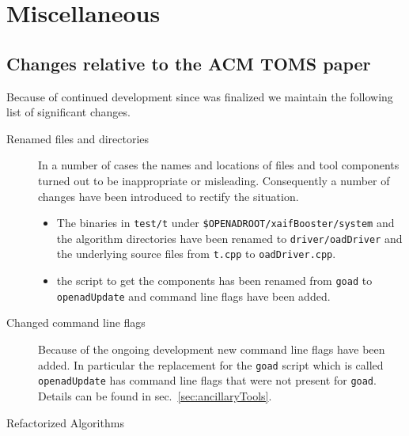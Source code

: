 \documentclass{book}
\newcommand{\refsec}[1]{{sec.~\ref{#1}}}
\begin{document}
\chapter{Miscellaneous}\label{sec:misc}
\section{Changes relative to the ACM TOMS paper}\label{sec:changesSinceTOMS}
Because of continued development since \cite{Utke2008OAM} was finalized 
we maintain the following list of significant changes.
\begin{description} 
\item[Renamed files and directories] In a number of cases the names and locations of files and 
tool components turned out to be inappropriate or misleading. Consequently a number of changes 
have been introduced to rectify the situation.  
{
\begin{itemize}
\item The binaries in \lstinline{test/t} under \lstinline{$OPENADROOT/xaifBooster/system} %
and the algorithm directories have been renamed to \lstinline{driver/oadDriver} and the 
underlying source files from \lstinline{t.cpp} to \lstinline{oadDriver.cpp}.
\item the script to get the components has been renamed from \lstinline{goad} to \lstinline{openadUpdate}
and command line flags have been added.
\end{itemize}
}
\item[Changed command line flags] Because of the ongoing development new command line flags have been added.
In particular the replacement for the \lstinline{goad} script which is called \lstinline{openadUpdate} has command 
line flags that were not present for \lstinline{goad}. Details can be found in \refsec{sec:ancillaryTools}.
\item[Refactorized Algorithms]
\end{description}
\end{document}
